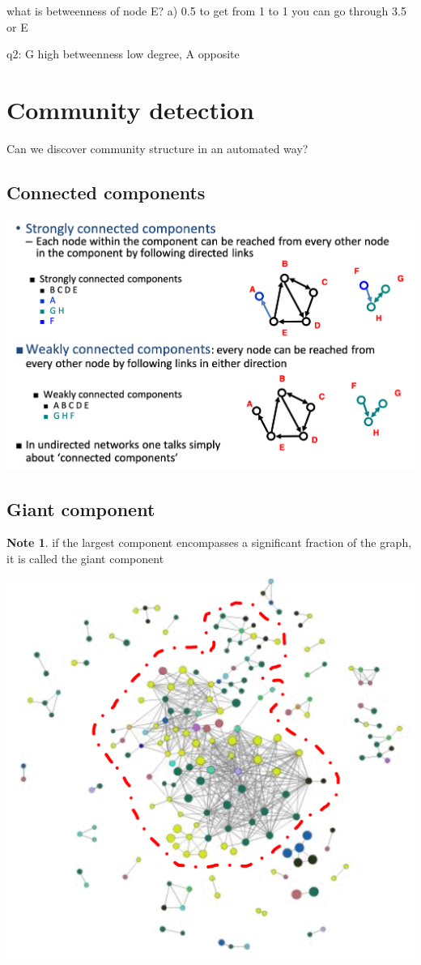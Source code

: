 \documentclass[11pt]{article}
\theoremstyle{definition}
\newtheorem{note}{Note}
\begin{document}
what is betweenness of node E? a) 0.5
to get from 1 to 1 you can go through 3.5 or E

q2: G high betweenness low degree, A opposite
\section{Community detection}

Can we discover community
structure in an automated way?

\subsection{Connected components}
\includegraphics[width=\textwidth/2]{19.png}

\subsection{Giant component}
\begin{note}
    if the largest component encompasses a significant fraction of the
graph, it is called the giant component
\end{note}
\includegraphics[width=\textwidth/4]{20.png}
\end{document}
